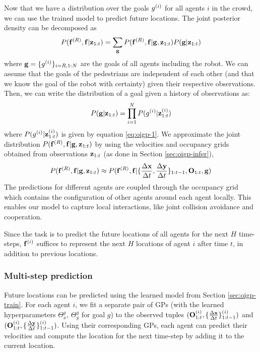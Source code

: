 Now that we have a distribution over the goals $g^{(i)}$ for all agents
$i$ in the crowd, we can use the trained model to predict future
locations. The joint posterior density can be decomposed as
\begin{equation}
  \label{eq:oigp-11}
  P(\mathbf{f}^{(R)}, \mathbf{f} | \mathbf{z}_{1:t}) = \sum_{\mathbf{g}} P(\mathbf{f}^{(R)}, \mathbf{f} | \mathbf{g}, \mathbf{z}_{1:t}) P(\mathbf{g} | \mathbf{z}_{1:t})
\end{equation}
where $\mathbf{g} = \{g^{(i)}\}_{i=R,1:N}$ are the goals of all agents
including the robot.
%
%
We can assume that the goals of the pedestrians are independent of
each other (and that we know the goal of the robot with certainty)
given their respective observations. Then, we can write the
distribution of a goal given a history of observations as:
\begin{equation}
  \label{eq:oigp-12}
  P(\mathbf{g}|\mathbf{z}_{1:t}) = \prod_{i=1}^{N} P(g^{(i)}|\mathbf{z}_{1:t}^{(i)})
\end{equation}
where $P(g^{(i)}|\mathbf{z}_{1:t}^{(i)})$ is given by equation \ref{eq:oigp-1}.
We approximate the joint distribution
$P(\mathbf{f}^{(R)}, \mathbf{f}|\mathbf{g}, \mathbf{z}_{1:t})$ by using the velocities
and occupancy grids obtained from observations $\mathbf{z}_{1:t}$ (as done
in Section \ref{sec:oigp-infer}),
\begin{equation}
  \label{eq:oigp-13}
  P(\mathbf{f}^{(R)}, \mathbf{f}|\mathbf{g}, \mathbf{z}_{1:t}) \approx P(\mathbf{f}^{(R)}, \mathbf{f}|\{\frac{\Delta \mathbf{x}}{\Delta t}, \frac{\Delta \mathbf{y}}{\Delta t}\}_{1:t-1}, \mathbf{O}_{1:t}, \mathbf{g})
\end{equation}
%
%
The predictions for different agents are coupled through the occupancy
grid which contains the configuration of other agents around each
agent locally.
%
%
%
%
This enables our model to capture local interactions, like joint
collision avoidance and cooperation.

Since the task is to predict the future locations of all agents for
the next $H$ time-steps, $\mathbf{f}^{(i)}$ suffices to represent the next
$H$ locations of agent $i$ after time $t$, in addition to previous
locations.

\subsubsection{Multi-step prediction}
\label{sec:oigp-sampling}
Future locations can be predicted using the learned model from Section
\ref{sec:oigp-train}. For each agent $i$, we fit a separate pair of GPs
(with the learned hyperparameters $\Theta_x^g$, $\Theta_y^g$ for goal
$g$) to the observed tuples $(\mathbf{O}^{(i)}_{1:t}, \{\frac{\Delta \mathbf{x}}{\Delta t}\}_{1:t-1}^{(i)})$
and $(\mathbf{O}^{(i)}_{1:t}, \{\frac{\Delta \mathbf{y}}{\Delta t}\}_{1:t-1}^{(i)})$. Using their
corresponding GPs, each agent can predict their velocities and compute
the location for the next time-step by adding it to the current
location.

